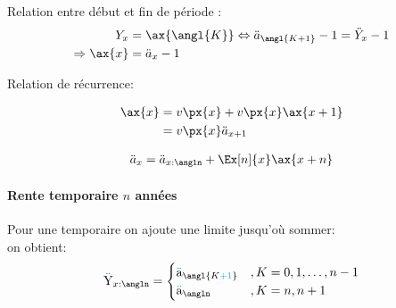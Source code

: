 \documentclass[10pt, french]{article}
\newcommand\cumlaut[2][black]{\stackon[.33ex]{#2}{\textcolor{#1}{\kern-.04ex.\kern-.2ex.}}}
\begin{document}
\begin{multicols*}{3}
Relation entre début et fin de période :
\begin{align*}
	Y_{x}	
	&=	\ax{\angl{K}}	
	\Leftrightarrow	\ddot{a}_{\angl{K + 1}} - 1 
	=	\ddot{Y}_{x} - 1 	\\
	\Rightarrow \ax{x} 
	&= \ddot{a}_{x} - 1
\end{align*}

Relation de récurrence:

\begin{minipage}{0.5\columnwidth}
\begin{align*}
	\ax{x} 
	&= v \px{x}	+	v \px{x}	 \ax{x + 1}	\\
	&= v \px{x}\ddot{a}_{x + 1}	
\end{align*}
\end{minipage}
\begin{minipage}{0.5\columnwidth}
\begin{align*}
	\ddot{a}_{x} 
	&= \ddot{a}_{x:\angln}	+	\Ex[n]{x}	 \ax{x + n}	\\
\end{align*}
\end{minipage}


\paragraph{Rente temporaire $n$ années}

Pour une temporaire on ajoute une limite jusqu'où sommer:\\
on obtient:
\begin{align*}
	\cumlaut[cyan]{Y}_{x:\angln} 
	&= 	\begin{cases}
			\cumlaut[cyan]{a}_{\angl{K \textcolor{cyan}{+ 1}}}	& , K = 0, 1, \dots, n - 1 \\
			\cumlaut[cyan]{a}_{\angln}			& , K = n, n + 1 \\
		\end{cases} 	\\
\end{align*}


\end{multicols*}
\end{document}

